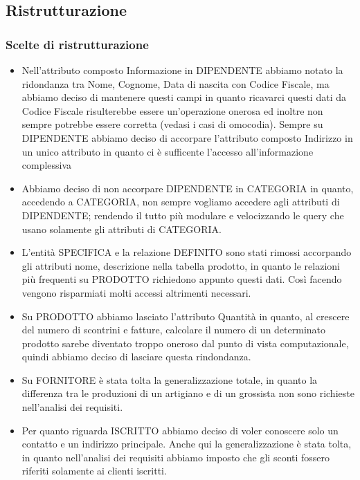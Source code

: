\subsection{Ristrutturazione}

\subsubsection{Scelte di ristrutturazione}
\begin{itemize}

\item Nell'attributo composto Informazione in DIPENDENTE abbiamo notato la ridondanza tra Nome, Cognome, Data di nascita con Codice Fiscale, ma abbiamo deciso di mantenere questi campi in quanto ricavarci questi dati da Codice Fiscale risulterebbe essere un'operazione onerosa ed inoltre non sempre potrebbe essere corretta (vedasi i casi di omocodia). Sempre su DIPENDENTE abbiamo deciso di accorpare l'attributo composto Indirizzo in un unico attributo in quanto ci \`e sufficente l'accesso all'informazione complessiva

\item Abbiamo deciso di non accorpare DIPENDENTE in CATEGORIA in quanto, accedendo a CATEGORIA, non sempre vogliamo accedere agli attributi di DIPENDENTE; rendendo il tutto pi\`u modulare e velocizzando le query che usano solamente gli attributi di CATEGORIA.

\item L'entit\`a SPECIFICA e la relazione DEFINITO sono stati rimossi accorpando gli attributi nome, descrizione nella tabella prodotto, in quanto le relazioni pi\`u frequenti su PRODOTTO richiedono appunto questi dati. Cos\`i facendo vengono risparmiati molti accessi altrimenti necessari.

\item Su PRODOTTO abbiamo lasciato l'attributo Quantit\`a in quanto, al crescere del numero di scontrini e fatture, calcolare il numero di un determinato prodotto sarebe diventato troppo oneroso dal punto di vista computazionale, quindi abbiamo deciso di lasciare questa rindondanza.

\item Su FORNITORE \`e stata tolta la generalizzazione totale, in quanto la differenza tra le produzioni di un artigiano e di un grossista non sono richieste nell'analisi dei requisiti.

\item Per quanto riguarda ISCRITTO abbiamo deciso di voler conoscere solo un contatto e un indirizzo principale. Anche qui la generalizzazione \`e stata tolta, in quanto nell'analisi dei requisiti abbiamo imposto che gli sconti fossero riferiti solamente ai clienti iscritti.
  
\end{itemize}

